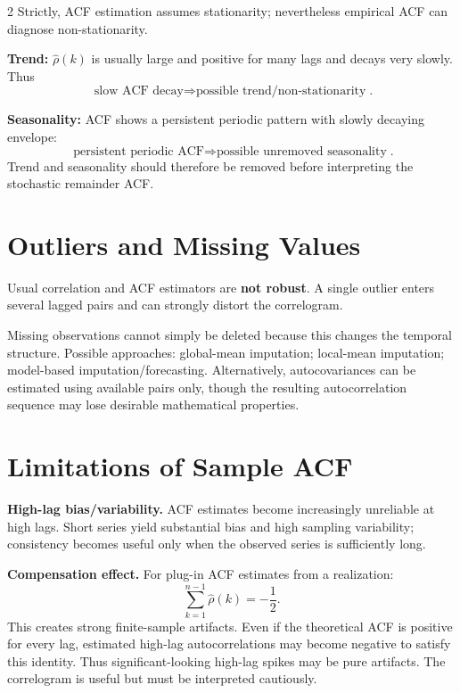 \documentclass[9pt,a4paper]{extarticle}
\newcommand{\key}[1]{\textbf{#1}}
\begin{document}
\begin{multicols}{2}
Strictly, ACF estimation assumes stationarity; nevertheless empirical ACF can diagnose non-stationarity.

\key{Trend:} \(\widehat\rho(k)\) is usually large and positive for many lags and decays very slowly. Thus
\[
\boxed{\text{slow ACF decay}\Rightarrow\text{possible trend/non-stationarity}}.
\]

\key{Seasonality:} ACF shows a persistent periodic pattern with slowly decaying envelope:
\[
\boxed{\text{persistent periodic ACF}\Rightarrow\text{possible unremoved seasonality}}.
\]
Trend and seasonality should therefore be removed before interpreting the stochastic remainder ACF.

\section{Outliers and Missing Values}

Usual correlation and ACF estimators are \key{not robust}. A single outlier enters several lagged pairs and can strongly distort the correlogram.

Missing observations cannot simply be deleted because this changes the temporal structure. Possible approaches: global-mean imputation; local-mean imputation; model-based imputation/forecasting. Alternatively, autocovariances can be estimated using available pairs only, though the resulting autocorrelation sequence may lose desirable mathematical properties.

\section{Limitations of Sample ACF}

\key{High-lag bias/variability.} ACF estimates become increasingly unreliable at high lags. Short series yield substantial bias and high sampling variability; consistency becomes useful only when the observed series is sufficiently long.

\key{Compensation effect.} For plug-in ACF estimates from a realization:
\[
\boxed{\sum_{k=1}^{n-1}\widehat\rho(k)=-\frac12.}
\]
This creates strong finite-sample artifacts. Even if the theoretical ACF is positive for every lag, estimated high-lag autocorrelations may become negative to satisfy this identity. Thus significant-looking high-lag spikes may be pure artifacts. The correlogram is useful but must be interpreted cautiously.


\end{multicols}
\end{document}

